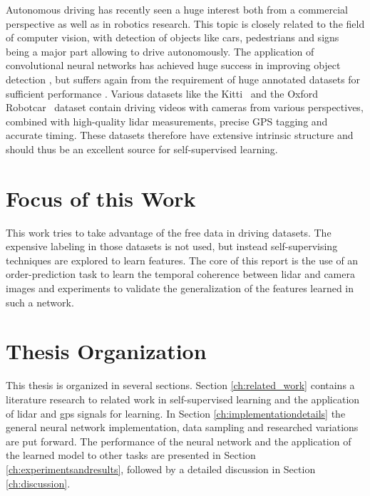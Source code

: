 Autonomous driving has recently seen a huge interest both from a commercial perspective as well as in robotics research. This topic is closely related to the field of computer vision, with detection of objects like cars, pedestrians and signs being a major part allowing to drive autonomously. The application of convolutional neural networks has achieved huge success in improving object detection \needref, but suffers again from the requirement of huge annotated datasets for sufficient performance \needref. Various datasets like the Kitti~\cite{geiger2012} and the Oxford Robotcar~\cite{maddern2017} dataset contain driving videos with cameras from various perspectives, combined with high-quality lidar measurements, precise GPS tagging and accurate timing. These datasets therefore have extensive intrinsic structure and should thus be an excellent source for self-supervised learning. 

\section{Focus of this Work}
This work tries to take advantage of the free data in driving datasets. The expensive labeling in those datasets is not used, but instead self-supervising techniques are explored to learn features. The core of this report is the use of an order-prediction task to learn the temporal coherence between lidar and camera images and experiments to validate the generalization of the features learned in such a network.

\section{Thesis Organization}
This thesis is organized in several sections. Section \ref{ch:related_work} contains a literature research to related work in self-supervised learning and the application of lidar and gps signals for learning. In Section \ref{ch:implementationdetails} the general neural network implementation, data sampling and researched variations are put forward. The performance of the neural network and the application of the learned model to other tasks are presented in Section \ref{ch:experimentsandresults}, followed by a detailed discussion in Section \ref{ch:discussion}.
